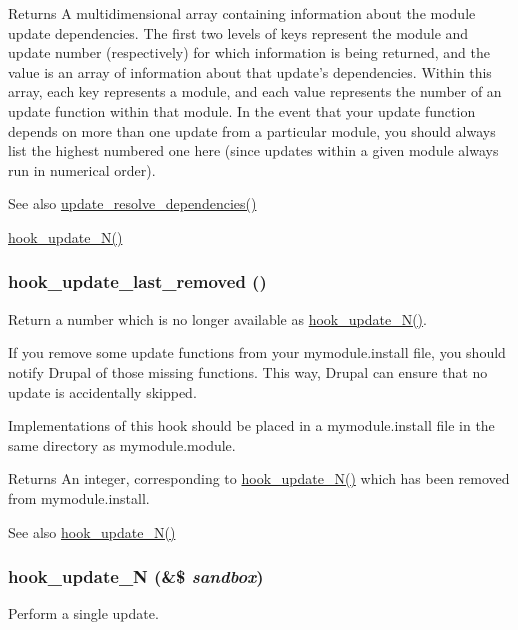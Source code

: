 \begin{DoxyReturn}{Returns}
A multidimensional array containing information about the module update dependencies. The first two levels of keys represent the module and update number (respectively) for which information is being returned, and the value is an array of information about that update's dependencies. Within this array, each key represents a module, and each value represents the number of an update function within that module. In the event that your update function depends on more than one update from a particular module, you should always list the highest numbered one here (since updates within a given module always run in numerical order).
\end{DoxyReturn}
\begin{DoxySeeAlso}{See also}
\hyperlink{update_8inc_aa931d6cdddc2e9e0ec96d240523056e9}{update\_\-resolve\_\-dependencies()} 

\hyperlink{group__hooks_ga908950689e6b85cd0fae3b780d69a41f}{hook\_\-update\_\-N()} 
\end{DoxySeeAlso}
\hypertarget{group__hooks_ga2fc0f6e61d252afa19e87804dbfdb558}{
\subsubsection[{hook\_\-update\_\-last\_\-removed}]{\setlength{\rightskip}{0pt plus 5cm}hook\_\-update\_\-last\_\-removed ()}}
\label{group__hooks_ga2fc0f6e61d252afa19e87804dbfdb558}
Return a number which is no longer available as \hyperlink{group__hooks_ga908950689e6b85cd0fae3b780d69a41f}{hook\_\-update\_\-N()}.

If you remove some update functions from your mymodule.install file, you should notify Drupal of those missing functions. This way, Drupal can ensure that no update is accidentally skipped.

Implementations of this hook should be placed in a mymodule.install file in the same directory as mymodule.module.

\begin{DoxyReturn}{Returns}
An integer, corresponding to \hyperlink{group__hooks_ga908950689e6b85cd0fae3b780d69a41f}{hook\_\-update\_\-N()} which has been removed from mymodule.install.
\end{DoxyReturn}
\begin{DoxySeeAlso}{See also}
\hyperlink{group__hooks_ga908950689e6b85cd0fae3b780d69a41f}{hook\_\-update\_\-N()} 
\end{DoxySeeAlso}
\hypertarget{group__hooks_ga908950689e6b85cd0fae3b780d69a41f}{
\subsubsection[{hook\_\-update\_\-N}]{\setlength{\rightskip}{0pt plus 5cm}hook\_\-update\_\-N (\&\$ {\em sandbox})}}
\label{group__hooks_ga908950689e6b85cd0fae3b780d69a41f}
Perform a single update.

